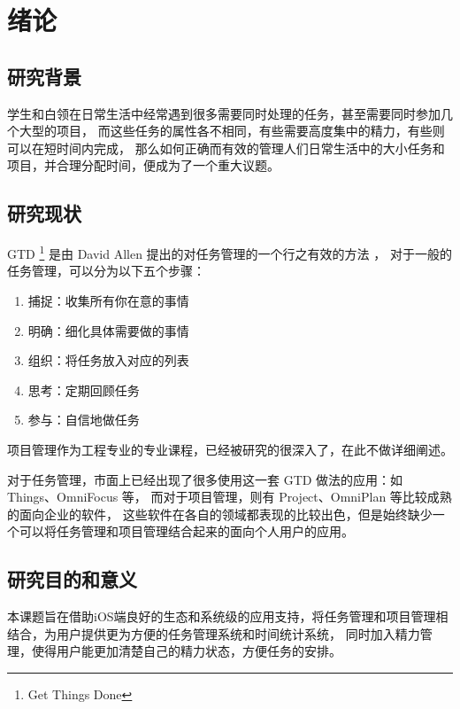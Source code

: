 
\chapter{绪论}
\label{chap:intro}

\section{研究背景}

学生和白领在日常生活中经常遇到很多需要同时处理的任务，甚至需要同时参加几个大型的项目，
而这些任务的属性各不相同，有些需要高度集中的精力，有些则可以在短时间内完成，
那么如何正确而有效的管理人们日常生活中的大小任务和项目，并合理分配时间，便成为了一个重大议题。

\section{研究现状}
GTD \footnote{Get Things Done} 是由 David Allen 提出的对任务管理的一个行之有效的方法 \parencite{allen2015getting} ，
对于一般的任务管理，可以分为以下五个步骤：
\begin{enumerate}
	\item 捕捉：收集所有你在意的事情
	\item 明确：细化具体需要做的事情
	\item 组织：将任务放入对应的列表
	\item 思考：定期回顾任务
	\item 参与：自信地做任务
\end{enumerate}

项目管理作为工程专业的专业课程，已经被研究的很深入了，在此不做详细阐述。

对于任务管理，市面上已经出现了很多使用这一套 GTD 做法的应用：如 Things、OmniFocus 等，
而对于项目管理，则有 Project、OmniPlan 等比较成熟的面向企业的软件，
这些软件在各自的领域都表现的比较出色，但是始终缺少一个可以将任务管理和项目管理结合起来的面向个人用户的应用。

\section{研究目的和意义}
本课题旨在借助iOS端良好的生态和系统级的应用支持，将任务管理和项目管理相结合，为用户提供更为方便的任务管理系统和时间统计系统\parencite{hollemans2017ios}，
同时加入精力管理，使得用户能更加清楚自己的精力状态，方便任务的安排\parencite{loehr2005power}。


